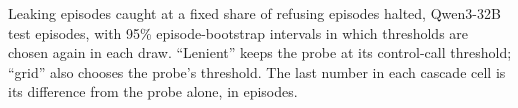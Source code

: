 \begin{table}[h]
  \centering
  \small
  
  \caption{Leaking episodes caught at a fixed share of refusing episodes halted, Qwen3-32B test episodes, with 95\% episode-bootstrap intervals in which thresholds are chosen again in each draw. ``Lenient'' keeps the probe at its control-call threshold; ``grid'' also chooses the probe's threshold. The last number in each cascade cell is its difference from the probe alone, in episodes.}
  \label{tab:cascade}
\end{table}
